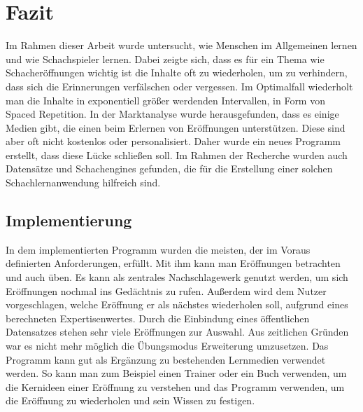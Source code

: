 
\chapter{Fazit}
Im Rahmen dieser Arbeit wurde untersucht, wie Menschen im Allgemeinen lernen und wie Schachspieler lernen. Dabei zeigte sich, dass es für ein Thema wie Schacheröffnungen wichtig ist die Inhalte oft zu wiederholen, um zu verhindern, dass sich die Erinnerungen verfälschen oder vergessen. Im Optimalfall wiederholt man die Inhalte in exponentiell größer werdenden Intervallen, in Form von Spaced Repetition. In der Marktanalyse wurde herausgefunden, dass es einige Medien gibt, die einen beim Erlernen von Eröffnungen unterstützen. Diese sind aber oft nicht kostenlos oder personalisiert. Daher wurde ein neues Programm erstellt, dass diese Lücke schließen soll. Im Rahmen der Recherche wurden auch Datensätze und Schachengines gefunden, die für die Erstellung einer solchen Schachlernanwendung hilfreich sind.

\section{Implementierung}
In dem implementierten Programm wurden die meisten, der im Voraus definierten Anforderungen, erfüllt. Mit ihm kann man Eröffnungen betrachten und auch üben. Es kann als zentrales Nachschlagewerk genutzt werden, um sich Eröffnungen nochmal ins Gedächtnis zu rufen. Außerdem wird dem Nutzer vorgeschlagen, welche Eröffnung er als nächstes wiederholen soll, aufgrund eines berechneten Expertisenwertes. Durch die Einbindung eines öffentlichen Datensatzes stehen sehr viele Eröffnungen zur Auswahl. Aus zeitlichen Gründen war es nicht mehr möglich die Übungsmodus Erweiterung umzusetzen. Das Programm kann gut als Ergänzung zu bestehenden Lernmedien verwendet werden. So kann man zum Beispiel einen Trainer oder ein Buch verwenden, um die Kernideen einer Eröffnung zu verstehen und das Programm verwenden, um die Eröffnung zu wiederholen und sein Wissen zu festigen.

